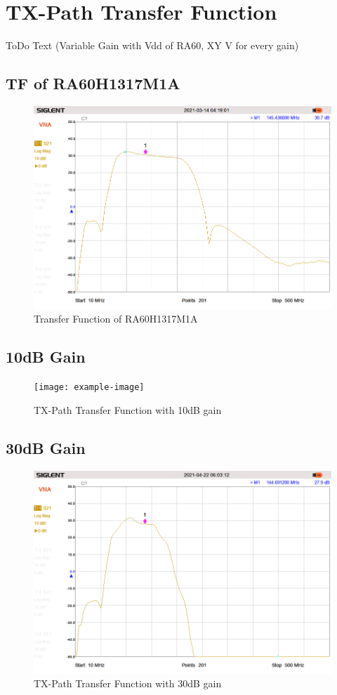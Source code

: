\section{TX-Path Transfer Function}
ToDo Text (Variable Gain with Vdd of RA60, XY V for every gain)

\subsection{TF of RA60H1317M1A}
	\begin{figure}[ht!]
		\centering
		\includegraphics[width = 12cm]{./5_measurements/fig/RA60H-TF}
		\caption{Transfer Function of RA60H1317M1A}
		\label{fig:ra60h1317m1a TF}
	\end{figure}
	\newpage

\subsection{10dB Gain}
\begin{figure}[ht!]
	\centering
	\texttt{[image: example-image]}
	\caption{TX-Path Transfer Function with 10dB gain}
	\label{fig:10dB Gain}
\end{figure}

\subsection{30dB Gain}
	\begin{figure}[ht!]
		\centering
		\includegraphics[width = 12cm]{./5_measurements/fig/TX-Path}
		\caption{TX-Path Transfer Function with 30dB gain}
		\label{fig:30dB Gain}
	\end{figure}
	\newpage
	
